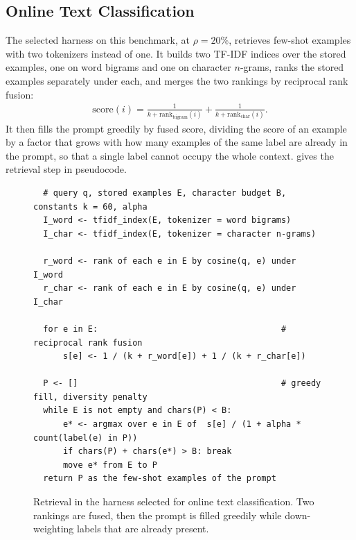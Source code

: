\documentclass{article} %
\begin{document}
\subsection{Online Text Classification}

The selected harness on this benchmark, at $\rho{=}20\%$, retrieves few-shot
examples with two tokenizers instead of one. It builds two TF-IDF indices over
the stored examples, one on word bigrams and one on character $n$-grams, ranks
the stored examples separately under each, and merges the two rankings by
reciprocal rank fusion:
\begin{equation}
\begin{aligned}
\mathrm{score}(i) = \frac{1}{k + \mathrm{rank}_{\text{bigram}}(i)} + \frac{1}{k + \mathrm{rank}_{\text{char}}(i)}.
\end{aligned}
\label{eq:rrf}
\end{equation}
It then fills the prompt greedily by fused score, dividing the score of an
example by a factor that grows with how many examples of the same label are
already in the prompt, so that a single label cannot occupy the whole context.
 gives the retrieval step in pseudocode.

\begin{figure}[ht]
\small
\begin{verbatim}
  # query q, stored examples E, character budget B, constants k = 60, alpha
  I_word <- tfidf_index(E, tokenizer = word bigrams)
  I_char <- tfidf_index(E, tokenizer = character n-grams)

  r_word <- rank of each e in E by cosine(q, e) under I_word
  r_char <- rank of each e in E by cosine(q, e) under I_char

  for e in E:                                     # reciprocal rank fusion
      s[e] <- 1 / (k + r_word[e]) + 1 / (k + r_char[e])

  P <- []                                         # greedy fill, diversity penalty
  while E is not empty and chars(P) < B:
      e* <- argmax over e in E of  s[e] / (1 + alpha * count(label(e) in P))
      if chars(P) + chars(e*) > B: break
      move e* from E to P
  return P as the few-shot examples of the prompt
\end{verbatim}
\vspace{-6pt}
\caption{Retrieval in the harness selected for online text classification.
Two rankings are fused, then the prompt is filled greedily while down-weighting
labels that are already present.}
\label{fig:code_tc}
\end{figure}
\end{document}
